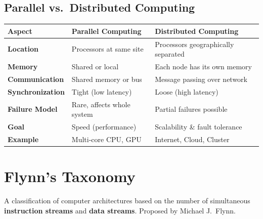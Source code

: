 \documentclass[11pt,a4paper]{article}
\begin{document}
\subsection{Parallel vs.\ Distributed Computing}

\begin{longtable}{@{}p{4cm}p{5.2cm}p{5.2cm}@{}}
\toprule
\rowcolor{primary!15}
\textbf{Aspect} & \textbf{Parallel Computing} & \textbf{Distributed Computing} \\
\midrule
\endhead
\textbf{Location} & Processors at same site & Processors geographically separated \\
\textbf{Memory} & Shared or local & Each node has its own memory \\
\textbf{Communication} & Shared memory or bus & Message passing over network \\
\textbf{Synchronization} & Tight (low latency) & Loose (high latency) \\
\textbf{Failure Model} & Rare, affects whole system & Partial failures possible \\
\textbf{Goal} & Speed (performance) & Scalability \& fault tolerance \\
\textbf{Example} & Multi-core CPU, GPU & Internet, Cloud, Cluster \\
\bottomrule
\end{longtable}

\section{Flynn's Taxonomy}

\begin{conceptbox}
A classification of computer architectures based on the number of simultaneous \textbf{instruction streams} and \textbf{data streams}. Proposed by Michael J.\ Flynn.
\end{conceptbox}
\end{document}

